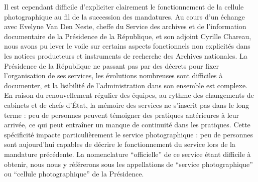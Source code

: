 Il est cependant difficile d'expliciter clairement le fonctionnement de la cellule photographique au fil de la succession des mandatures. Au cours d'un échange avec Evelyne Van Den Neste, cheffe du Service des archives et de l'information documentaire de la Présidence de la République, et son adjoint Cyrille Chareau, nous avons pu lever le voile sur certains aspects fonctionnels non explicités dans les notices producteurs et instruments de recherche des Archives nationales. La Présidence de la République ne passant pas par des décrets pour fixer l’organisation de ses services, les évolutions nombreuses sont difficiles à documenter, et la lisibilité de l’administration dans son ensemble est complexe. En raison du renouvellement régulier des équipes, au rythme des changements de cabinets et de chefs d’État, la mémoire des services ne s'inscrit pas dans le long terme : peu de personnes peuvent témoigner des pratiques antérieures à leur arrivée, ce qui peut entraîner un manque de continuité dans les pratiques. Cette spécificité impacte particulièrement le service photographique : peu de personnes sont aujourd’hui capables de décrire le fonctionnement du service lors de la mandature précédente. La nomenclature \enquote{officielle} de ce service étant difficile à obtenir, nous nous y référerons sous les appellations de \enquote{service photographique} ou \enquote{cellule photographique} de la Présidence. 

